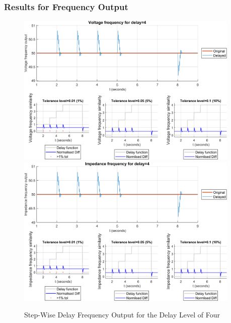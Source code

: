 \subsubsection{Results for Frequency Output}


\begin{figure}
    \caption{Step-Wise Delay Frequency Output for the Delay Level of Four}
    \includegraphics[width=0.95\textwidth]{PMUsim-figures/DelayOf_4/Step_vFrequency.png}    
    \label{fig:PMUsimStep_Four_vFrequency}
    \includegraphics[width=0.95\textwidth]{PMUsim-figures/DelayOf_4/Step_iFrequency.png}    
    \label{fig:PMUsimStep_Four_Frequency}
        \begin{small}
     \end{small}
\end{figure}


